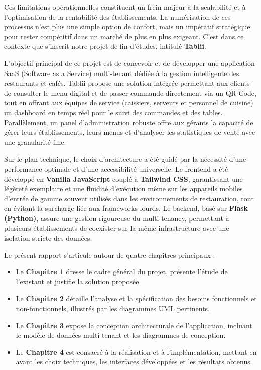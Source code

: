 \documentclass[12pt,a4paper]{report}
\begin{document}
Ces limitations opérationnelles constituent un frein majeur à la scalabilité et à l'optimisation de la rentabilité des établissements. La numérisation de ces processus n'est plus une simple option de confort, mais un impératif stratégique pour rester compétitif dans un marché de plus en plus exigeant. C'est dans ce contexte que s'inscrit notre projet de fin d'études, intitulé \textbf{Tablii}.

L'objectif principal de ce projet est de concevoir et de développer une application SaaS (Software as a Service) multi-tenant dédiée à la gestion intelligente des restaurants et cafés. Tablii propose une solution intégrée permettant aux clients de consulter le menu digital et de passer commande directement via un QR Code, tout en offrant aux équipes de service (caissiers, serveurs et personnel de cuisine) un dashboard en temps réel pour le suivi des commandes et des tables. Parallèlement, un panel d'administration robuste offre aux gérants la capacité de gérer leurs établissements, leurs menus et d'analyser les statistiques de vente avec une granularité fine.

Sur le plan technique, le choix d'architecture a été guidé par la nécessité d'une performance optimale et d'une accessibilité universelle. Le frontend a été développé en \textbf{Vanilla JavaScript} couplé à \textbf{Tailwind CSS}, garantissant une légèreté exemplaire et une fluidité d'exécution même sur les appareils mobiles d'entrée de gamme souvent utilisés dans les environnements de restauration, tout en évitant la surcharge liée aux frameworks lourds. Le backend, basé sur \textbf{Flask (Python)}, assure une gestion rigoureuse du multi-tenancy, permettant à plusieurs établissements de coexister sur la même infrastructure avec une isolation stricte des données.

Le présent rapport s'articule autour de quatre chapitres principaux :
\begin{itemize}
    \item Le \textbf{Chapitre 1} dresse le cadre général du projet, présente l'étude de l'existant et justifie la solution proposée.
    \item Le \textbf{Chapitre 2} détaille l'analyse et la spécification des besoins fonctionnels et non-fonctionnels, illustrés par les diagrammes UML pertinents.
    \item Le \textbf{Chapitre 3} expose la conception architecturale de l'application, incluant le modèle de données multi-tenant et les diagrammes de conception.
    \item Le \textbf{Chapitre 4} est consacré à la réalisation et à l'implémentation, mettant en avant les choix techniques, les interfaces développées et les résultats obtenus.
\end{itemize}
\end{document}
